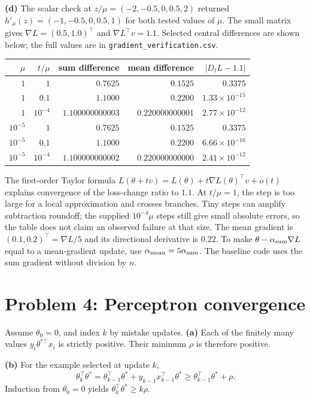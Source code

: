 \documentclass[11pt,a4paper]{article}
\begin{document}
\textbf{(d)} The scalar check at $z/\mu=(-2,-0.5,0,0.5,2)$ returned $h'_\mu(z)=(-1,-0.5,0,0.5,1)$ for both tested values of $\mu$. The small matrix gives $\nabla L=(0.5,1.0)^\top$ and $\nabla L^\top v=1.1$. Selected central differences are shown below; the full values are in \texttt{gradient\_verification.csv}.
\begin{center}\small
\begin{tabular}{@{}rrrrr@{}}\toprule
$\mu$&$t/\mu$&sum difference&mean difference&$|D_tL-1.1|$\\\midrule
$1$&$1$&$0.7625$&$0.1525$&$0.3375$\\
$1$&$0.1$&$1.1000$&$0.2200$&$1.33\times10^{-15}$\\
$1$&$10^{-4}$&$1.100000000003$&$0.220000000001$&$2.77\times10^{-12}$\\
$10^{-5}$&$1$&$0.7625$&$0.1525$&$0.3375$\\
$10^{-5}$&$0.1$&$1.1000$&$0.2200$&$6.66\times10^{-16}$\\
$10^{-5}$&$10^{-4}$&$1.100000000002$&$0.220000000000$&$2.41\times10^{-12}$\\\bottomrule
\end{tabular}\end{center}
The first-order Taylor formula $L(\theta+tv)=L(\theta)+t\nabla L(\theta)^\top v+o(t)$ explains convergence of the loss-change ratio to $1.1$. At $t/\mu=1$, the step is too large for a local approximation and crosses branches. Tiny steps can amplify subtraction roundoff; the supplied $10^{-4}\mu$ steps still give small absolute errors, so the table does not claim an observed failure at that size. The mean gradient is $(0.1,0.2)^\top=\nabla L/5$ and its directional derivative is $0.22$. To make $\theta-\alpha_{\rm sum}\nabla L$ equal to a mean-gradient update, use $\alpha_{\rm mean}=5\alpha_{\rm sum}$. The baseline code uses the sum gradient without division by $n$.

\section*{Problem 4: Perceptron convergence}
Assume $\theta_0=0$, and index $k$ by mistake updates.
\textbf{(a)} Each of the finitely many values $y_i\theta^{*\top}x_i$ is strictly positive. Their minimum $\rho$ is therefore positive.

\textbf{(b)} For the example selected at update $k$,
\[\theta_k^\top\theta^*=\theta_{k-1}^\top\theta^*+y_{k-1}x_{k-1}^\top\theta^*\geq\theta_{k-1}^\top\theta^*+\rho.\]
Induction from $\theta_0=0$ yields $\theta_k^\top\theta^*\geq k\rho$.
\end{document}
